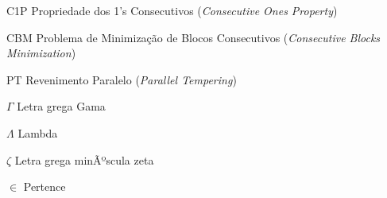 \documentclass[
	12pt,				%
	openany,			%
	oneside,			%
	a4paper,			%
	english,			%
	french,				%
	spanish,			%
	brazil				%
	]{abntex2}
\begin{document}
\listoffigures*
\cleardoublepage

\listoftables*
\cleardoublepage

\begin{siglas}
	\item[C1P]  Propriedade dos 1's Consecutivos (\textit{Consecutive Ones Property})
	\item[CBM]  Problema de Minimização de Blocos Consecutivos (\textit{Consecutive Blocks Minimization})
	\item[PT]   Revenimento Paralelo (\textit{Parallel Tempering})
\end{siglas}

\begin{simbolos}
	\item[$ \Gamma $] Letra grega Gama
	\item[$ \Lambda $] Lambda
	\item[$ \zeta $] Letra grega minÃºscula zeta
	\item[$ \in $] Pertence
\end{simbolos}

\tableofcontents*
\cleardoublepage










\printindex
\end{document}
